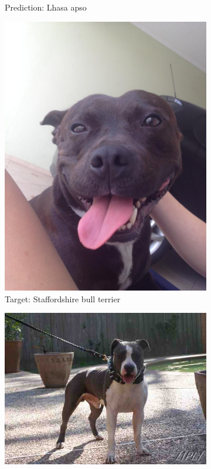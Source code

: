 \documentclass{article}
\begin{document}
\begin{figure}[htbp]
\begin{subfigure}{.45\textwidth}
            \caption{Prediction: Lhasa apso}
            \label{fig:lhasa}
        \end{subfigure}
        \begin{subfigure}{.35\textwidth}
            \centering
            \includegraphics[width=\linewidth]{img/dog_staffordshire_bull_terrier.jpeg}
            \caption{Target: Staffordshire bull terrier}
            \label{fig:staffy}
        \end{subfigure}%
        \hspace{0.1\textwidth}
        \begin{subfigure}{.45\textwidth}
            \centering
            \includegraphics[width=\linewidth]{img/American_staffordshire_terrier_00548.jpg}

\end{subfigure}
\end{figure}
\end{document}
